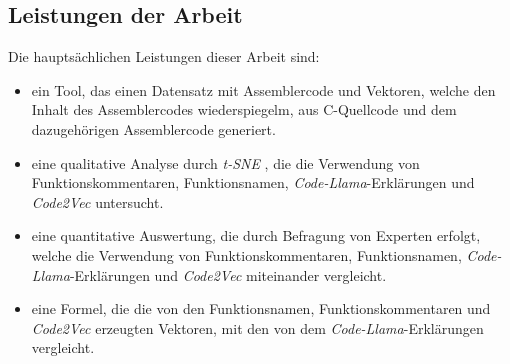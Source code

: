 \documentclass[12pt,letterpaper,ngerman]{article}
\begin{document}
\subsection{Leistungen der Arbeit}
Die hauptsächlichen Leistungen dieser Arbeit sind:
\begin{itemize}
  \item ein Tool, das einen Datensatz mit Assemblercode und
    Vektoren, welche den Inhalt des Assemblercodes wiederspiegelm,
    aus C-Quellcode und dem dazugehörigen Assemblercode generiert.
  \item eine qualitative Analyse durch 
    \textit{t-SNE} \cite{JMLR:v9:vandermaaten08a}, die die Verwendung von 
    Funktionskommentaren, Funktionsnamen, 
    \textit{Code-Llama}-Erklärungen\cite{rozière2024codellamaopenfoundation}
    und  \textit{Code2Vec}  \cite{code2vec}
    untersucht.
  \item eine quantitative Auswertung, die durch Befragung von 
    Experten erfolgt, welche die Verwendung von Funktionskommentaren,
    Funktionsnamen, \textit{Code-Llama}-Erklärungen und 
    \textit{Code2Vec}  miteinander vergleicht.
  \item eine Formel, die die von den Funktionsnamen, 
    Funktionskommentaren  und \textit{Code2Vec} erzeugten Vektoren, 
    mit den von dem \textit{Code-Llama}-Erklärungen vergleicht.
\end{itemize}
\pagebreak
\end{document}
